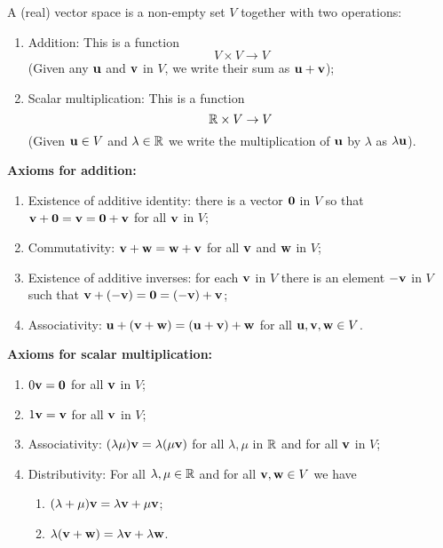 \documentclass[10pt, a4paper]{article}
\begin{document}
\begin{definition}
    A (real) vector space is a non-empty set $V$ together with two operations:
    \begin{enumerate}[label = (\roman*)]
        \item Addition:
        This is a function
        \[
        V \times V \rightarrow V
        \]
        (Given any $\mathbf{u}$ and $\mathbf{v}$ in $V$,
        we write their sum as $\mathbf{u + v}$);
        \item Scalar multiplication:
        This is a function
        \[
        \mathbb{R} \times V \rightarrow V
        \]
        (Given $\mathbf{u} \in V$ and $\lambda \in \mathbb{R}$ we write the multiplication of $\mathbf{u}$ by $\lambda$ as $\lambda\mathbf{u}$).
    \end{enumerate}
\end{definition}

\begin{proposition}\phantom{}

    \textbf{Axioms for addition:}
    \begin{enumerate}[label = (\roman*)]
        \item Existence of additive identity:
        there is a vector $\mathbf{0}$ in $V$ so that $\mathbf{v + 0} = \mathbf{v} = \mathbf{0 + v}$ for all $\mathbf{v}$ in $V$;
        \item Commutativity:
        $\mathbf{v + w} = \mathbf{w + v}$ for all $\mathbf{v}$ and $\mathbf{w}$ in $V$;
        \item Existence of additive inverses:
        for each $\mathbf{v}$ in $V$ there is an element $-\mathbf{v}$ in $V$ such that $\mathbf{v} + (-\mathbf{v}) = \mathbf{0} = (-\mathbf{v}) + \mathbf{v}$;
        \item Associativity:
        $\mathbf{u} + (\mathbf{v + w}) = (\mathbf{u + v}) + \mathbf{w}$ for all $\mathbf{u, v, w} \in V$.
    \end{enumerate}

    \textbf{Axioms for scalar multiplication:}
    \begin{enumerate}[label = (\roman*)]
        \item $0\mathbf{v} = \mathbf{0}$ for all $\mathbf{v}$ in $V$;
        \item $1\mathbf{v} = \mathbf{v}$ for all $\mathbf{v}$ in $V$;
        \item Associativity:
        $(\lambda\mu)\mathbf{v} = \lambda(\mu\mathbf{v})$ for all $\lambda, \mu$ in $\mathbb{R}$ and for all $\mathbf{v}$ in $V$;
        \item Distributivity:
        For all $\lambda, \mu \in \mathbb{R}$ and for all $\mathbf{v, w} \in V$ we have
        \begin{enumerate}[label = \alph*)]
            \item $(\lambda + \mu)\mathbf{v} = \lambda\mathbf{v} + \mu\mathbf{v}$;
            \item $\lambda(\mathbf{v + w}) = \lambda\mathbf{v} + \lambda\mathbf{w}$.
        \end{enumerate}
    \end{enumerate}
\end{proposition}
\end{document}
